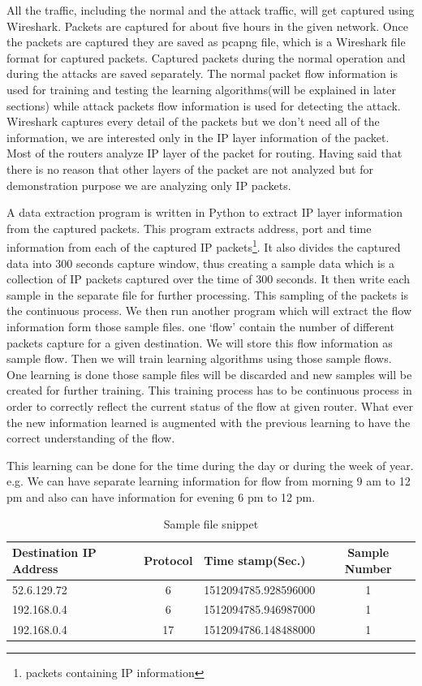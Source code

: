 \documentclass[10pt,oneside,a4paper]{article}
\begin{document}
All the traffic, including the normal and the attack traffic, will get captured using Wireshark. Packets are captured for about five hours in the given network. Once the packets are captured they are saved as pcapng file, which is a Wireshark file format for captured packets. Captured packets during the normal operation and during the attacks are saved separately. The normal packet flow information is used for training and testing the learning algorithms(will be explained in later sections) while attack packets flow information is used for detecting the attack. Wireshark captures every detail of the packets but we don't need all of the information, we are interested only in the IP layer information of the packet. Most of the routers analyze IP layer of the packet for routing. Having said that there is no reason that other layers of the packet are not analyzed but for demonstration purpose we are analyzing only IP packets.\par

 A data extraction program is written in Python to extract IP layer information from the captured packets. This program extracts address, port and time information from each of the captured IP packets\footnote{packets containing IP information}. It also divides the captured data into 300 seconds capture window, thus creating a sample data which is a collection of IP packets captured over the time of 300 seconds. It then write each sample in the separate file for further processing. This sampling of the packets is the continuous process. We then run another program which will extract the flow information form those sample files. one `flow' contain the number of different packets capture for a given destination. We will store this flow information as sample flow. Then we will train learning algorithms using those sample flows. One learning is done those sample files will be discarded and new samples will be created for further training. This training process has to be continuous process in order to correctly reflect the current status of the flow at given router. What ever the new information learned is augmented with the previous learning to have the correct understanding of the flow.

This learning can be done for the time during the day or during the week of year. e.g. We can have separate learning information for flow from morning 9 am to 12 pm and also can have information for evening 6 pm to 12 pm.

\begin{table}[H]
\centering
  \begin{tabular}{| l | c | l | c |}
    \hline
    Destination IP Address      & Protocol  & Time stamp(Sec.)  & Sample Number \\
    \hline
    52.6.129.72         & 6         & 1512094785.928596000  & 1 \\ \hline
    192.168.0.4         & 6         & 1512094785.946987000  & 1 \\ \hline
    192.168.0.4         & 17        & 1512094786.148488000  & 1 \\ \hline
  \end{tabular}
\caption{Sample file snippet} \label{table:sample-file-snippet}
\end{table}
\end{document}
